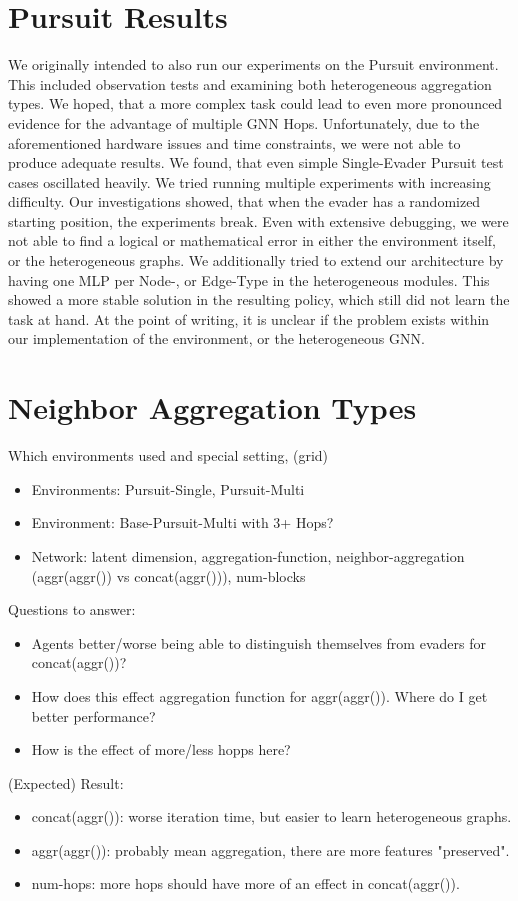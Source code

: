 \section{Pursuit Results}
We originally intended to also run our experiments on the Pursuit environment. This included observation tests and examining both heterogeneous aggregation types. We hoped, that a more complex task could lead to even more pronounced evidence for the advantage of multiple GNN Hops. Unfortunately, due to the aforementioned hardware issues and time constraints, we were not able to produce adequate results. We found, that even simple Single-Evader Pursuit test cases oscillated heavily. We tried running multiple experiments with increasing difficulty. Our investigations showed, that when the evader has a randomized starting position, the experiments break. Even with extensive debugging, we were not able to find a logical or mathematical error in either the environment itself, or the heterogeneous graphs. We additionally tried to extend our architecture by having one MLP per Node-, or Edge-Type in the heterogeneous modules. This showed a more stable solution in the resulting policy, which still did not learn the task at hand. At the point of writing, it is unclear if the problem exists within our implementation of the environment, or the heterogeneous GNN.


\iffalse
\section{Neighbor Aggregation Types}
\label{sec:Neighbor Aggregation Types}
Which environments used and special setting, (grid)
\begin{itemize}[noitemsep,nolistsep]
    \item Environments: Pursuit-Single, Pursuit-Multi
    \item Environment: Base-Pursuit-Multi with 3+ Hops?
    \item Network: latent dimension, aggregation-function, neighbor-aggregation (aggr(aggr()) vs concat(aggr())), num-blocks
\end{itemize}
Questions to answer:
\begin{itemize}[noitemsep,nolistsep]
    \item Agents better/worse being able to distinguish themselves from evaders for concat(aggr())?
    \item How does this effect aggregation function for aggr(aggr()). Where do I get better performance?
    \item How is the effect of more/less hopps here?
\end{itemize}
(Expected) Result:
\begin{itemize}[noitemsep,nolistsep]
    \item concat(aggr()): worse iteration time, but easier to learn heterogeneous graphs.
    \item aggr(aggr()): probably mean aggregation, there are more features "preserved".
    \item num-hops: more hops should have more of an effect in concat(aggr()).
\end{itemize}


